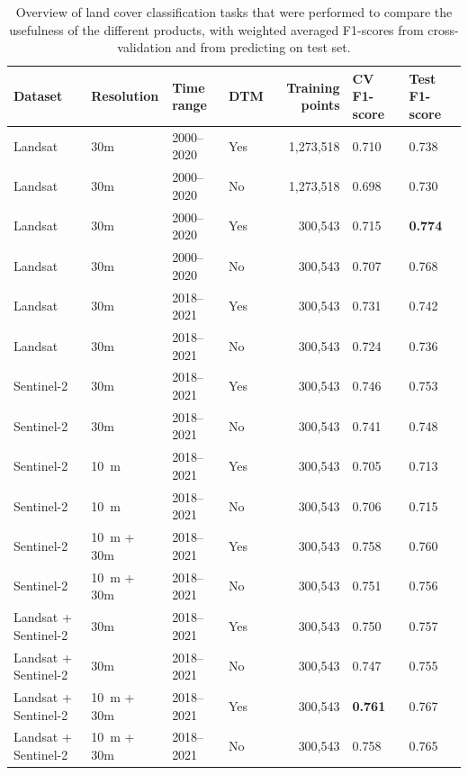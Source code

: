 \begin{table}[hbt]
\caption{Overview of land cover classification tasks that were performed to compare the usefulness of the different products, with weighted averaged F1-scores from cross-validation and from predicting on test set.}
\label{tab:landcover_experiments_results}
\begin{tabular}{@{}llllrll@{}}
\hline
Dataset    & Resolution & Time range & DTM  & Training points & CV F1-score & Test F1-score \\ 
\hline
Landsat    & 30m        & 2000--2020  & Yes              & 1,273,518 & 0.710 & 0.738 \\
Landsat    & 30m        & 2000--2020  & No               & 1,273,518 & 0.698 & 0.730 \\
Landsat    & 30m        & 2000--2020  & Yes              & 300,543   & 0.715 & \textbf{0.774} \\
Landsat    & 30m        & 2000--2020  & No               & 300,543   & 0.707 & 0.768 \\
Landsat    & 30m        & 2018--2021  & Yes              & 300,543   & 0.731 & 0.742 \\
Landsat    & 30m        & 2018--2021  & No               & 300,543   & 0.724 & 0.736 \\
Sentinel-2 & 30m        & 2018--2021  & Yes              & 300,543   & 0.746 & 0.753 \\
Sentinel-2 & 30m        & 2018--2021  & No               & 300,543   & 0.741 & 0.748 \\
Sentinel-2 & 10~m        & 2018--2021  & Yes              & 300,543   & 0.705 & 0.713 \\
Sentinel-2 & 10~m        & 2018--2021  & No               & 300,543   & 0.706 & 0.715 \\
Sentinel-2 & 10~m + 30m  & 2018--2021  & Yes              & 300,543   & 0.758 & 0.760 \\
Sentinel-2 & 10~m + 30m  & 2018--2021  & No               & 300,543   & 0.751 & 0.756 \\
Landsat + Sentinel-2 & 30m        & 2018--2021  & Yes    & 300,543   & 0.750 & 0.757 \\
Landsat + Sentinel-2 & 30m        & 2018--2021  & No     & 300,543   & 0.747 & 0.755 \\
Landsat + Sentinel-2 & 10~m + 30m  & 2018--2021  & Yes    & 300,543   & \textbf{0.761} & 0.767 \\
Landsat + Sentinel-2 & 10~m + 30m  & 2018--2021  & No     & 300,543   & 0.758 & 0.765 \\
\hline
\end{tabular}
\end{table}

